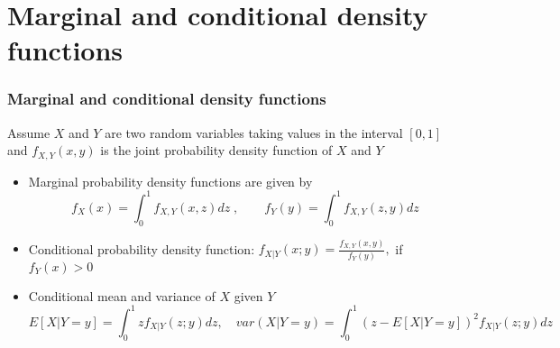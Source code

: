 \section{Marginal and conditional density functions}
\separatorslide
\begin{frame}
	\frametitle{Marginal and conditional density functions}
	Assume $X$ and $Y$ are two random variables taking values in the interval $[0, 1]$\vspace{0.5em}\\
	and $f_{X,Y}(x,y)$ is the joint probability density function of $X$ and $Y$\vspace{0.5em}
 	\begin{itemize}%
 		\item <1-> Marginal probability density functions are given by
 		$$f_{X}(x)=\int_0^1f_{X,Y}(x,z) dz\;, \qquad f_{Y}(y)=\int_0^1f_{X,Y}(z,y) dz$$
 		
 		
 		\item <2-> Conditional probability density function: $f_{X|Y}(x;y)=\frac{f_{X,Y}(x,y)}{f_{Y}(y)},$ if $f_Y(x)>0$ 
 		\item <3-> Conditional mean and variance of $X$ given $Y$ 
		$$E[X|Y=y]\!=\int_0^1\!\! zf_{X|Y}(z;y)dz,\quad var(X|Y=y)\!=\int_0^1 \!\!(z-E[X|Y=y])^2f_{X|Y}(z;y)dz$$
 	\end{itemize}
 	
\end{frame}


